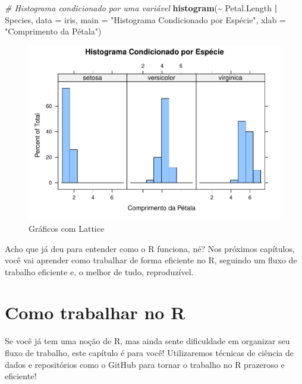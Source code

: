 \documentclass[
]{book}
\newenvironment{Shaded}{\begin{snugshade}}{\end{snugshade}}
\newcommand{\AttributeTok}[1]{\textcolor[rgb]{0.13,0.29,0.53}{#1}}
\newcommand{\CommentTok}[1]{\textcolor[rgb]{0.56,0.35,0.01}{\textit{#1}}}
\newcommand{\FunctionTok}[1]{\textcolor[rgb]{0.13,0.29,0.53}{\textbf{#1}}}
\newcommand{\NormalTok}[1]{#1}
\newcommand{\SpecialCharTok}[1]{\textcolor[rgb]{0.81,0.36,0.00}{\textbf{#1}}}
\newcommand{\StringTok}[1]{\textcolor[rgb]{0.31,0.60,0.02}{#1}}
\begin{document}
\begin{Shaded}
\begin{Highlighting}[]
\CommentTok{\# Histograma condicionado por uma variável}
\FunctionTok{histogram}\NormalTok{(}\SpecialCharTok{\textasciitilde{}}\NormalTok{ Petal.Length }\SpecialCharTok{|}\NormalTok{ Species, }\AttributeTok{data =}\NormalTok{ iris,}
          \AttributeTok{main =} \StringTok{"Histograma Condicionado por Espécie"}\NormalTok{,}
          \AttributeTok{xlab =} \StringTok{"Comprimento da Pétala"}\NormalTok{)}
\end{Highlighting}
\end{Shaded}

\begin{figure}
\centering
\includegraphics{_main_files/figure-latex/nome-do-chunk-2.pdf}
\caption{\label{fig:nome-do-chunk-2}Gráficos com Lattice}
\end{figure}

Acho que já deu para entender como o R funciona, né? Nos próximos capítulos, você vai aprender como trabalhar de forma eficiente no R, seguindo um fluxo de trabalho eficiente e, o melhor de tudo, reproduzível.

\hypertarget{como-trabalhar-no-r}{%
\chapter{Como trabalhar no R}\label{como-trabalhar-no-r}}

Se você já tem uma noção de R, mas ainda sente dificuldade em organizar seu fluxo de trabalho, este capítulo é para você! Utilizaremos técnicas de ciência de dados e repositórios como o GitHub para tornar o trabalho no R prazeroso e eficiente!
\end{document}
